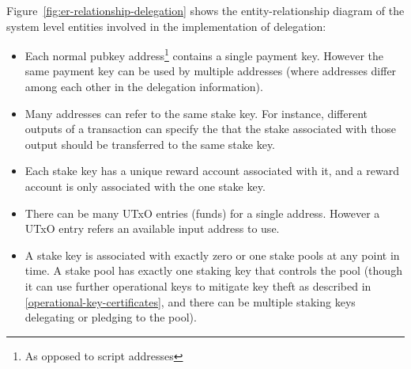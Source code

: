 \documentclass[11pt,a4paper]{article}
\begin{document}
Figure~\ref{fig:er-relationship-delegation} shows the entity-relationship
diagram of the system level entities involved in the implementation of
delegation:
\begin{itemize}
\item Each normal pubkey address\footnote{As opposed to script addresses}
  contains a single payment key. However the same payment key
  can be used by multiple addresses (where addresses differ among each other in
  the delegation information).
\item Many addresses can refer to the same stake key. For instance, different
  outputs of a transaction can specify the that the stake associated with those
  output should be transferred to the same stake key.
\item Each stake key has a unique reward account associated with it, and a
  reward account is only associated with the one stake key.
\item There can be many UTxO entries (funds) for a single address. However a
  UTxO entry refers an available input address to use.
\item A stake key is associated with exactly zero or one stake pools at any
  point in time. A stake pool has exactly one staking key that controls the pool
  (though it can use further operational keys to mitigate key theft as described
  in \cref{operational-key-certificates}, and there can
  be multiple staking keys delegating or pledging to the pool).
\end{itemize}
\end{document}
